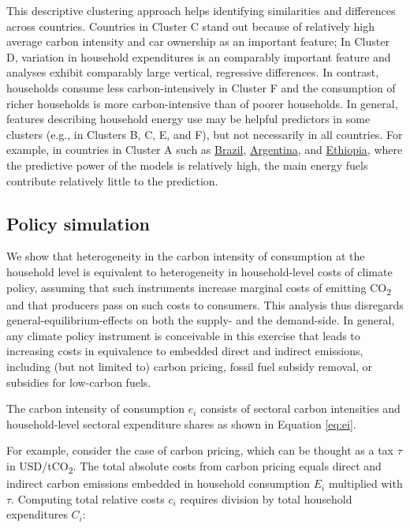 \documentclass[12pt, a4paper]{article}
\begin{document}
\begin{refsection}
This descriptive clustering approach helps identifying similarities and differences across countries. Countries in Cluster C stand out because of relatively high average carbon intensity and car ownership as an important feature; In Cluster D, variation in household expenditures is an comparably important feature and analyses exhibit comparably large vertical, regressive differences. In contrast, households consume less carbon-intensively in Cluster F and the consumption of richer households is more carbon-intensive than of poorer households. In general, features describing household energy use may be helpful predictors in some clusters (e.g., in Clusters B, C, E, and F), but not necessarily in all countries. For example, in countries in Cluster A such as \hyperref[fig:5b_BRA]{Brazil}, \hyperref[fig:5b_URY]{Argentina}, and \hyperref[fig:5b_ETH]{Ethiopia}, where the predictive power of the models is relatively high, the main energy fuels contribute relatively little to the prediction.

\subsection{Policy simulation}\label{sec:policysimulation}

We show that heterogeneity in the carbon intensity of consumption at the household level is equivalent to heterogeneity in household-level costs of climate policy, assuming that such instruments increase marginal costs of emitting CO\textsubscript{2} and that producers pass on such costs to consumers. This analysis thus disregards general-equilibrium-effects on both the supply- and the demand-side. In general, any climate policy instrument is conceivable in this exercise that leads to increasing costs in equivalence to embedded direct and indirect emissions, including (but not limited to) carbon pricing, fossil fuel subsidy removal, or subsidies for low-carbon fuels.

The carbon intensity of consumption $e_{i}$ consists of sectoral carbon intensities and household-level sectoral expenditure shares as shown in Equation \ref{eq:ei}. 

For example, consider the case of carbon pricing, which can be thought as a tax $\tau$ in USD/tCO\textsubscript{2}. The total absolute costs from carbon pricing equals direct and indirect carbon emissions embedded in household consumption $E_{i}$ multiplied with $\tau$. Computing total relative costs $c_{i}$ requires division by total household expenditures $C_{i}$:


\end{refsection}
\end{document}
